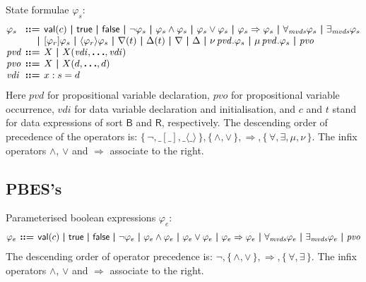 \documentclass[a4paper,fleqn,10pt]{article}
\makeatletter
\newcommand{\f}[1]{\ensuremath{\mathit{#1}}}
\newcommand{\sbool}{\ensuremath{\mathsf{B}}}
\newcommand{\sreal}{\ensuremath{\mathsf{R}}}
\newenvironment{tightarray}[1]
  {\setlength{\arraycolsep}{2pt}%
   \begin{array}{@{}#1@{}}%
  }
  {\end{array}%
  }
\newcommand{\set}[1]{\ensuremath{\{\,#1\,\}}}
\newcommand{\limp}{\ensuremath{\Rightarrow}}
\newcommand{\mb}[1]{\text{\boldmath$#1$}}
\makeatother
\begin{document}
State formulae $\varphi_s$:
\[\begin{tightarray}{lrl}
\varphi_s & \mb{::=} & \mathsf{val}(c)\ \mb{|}\ 
                     \mathsf{true}\ \mb{|}\ 
                     \mathsf{false}\ \mb{|}\ 
                     \neg \varphi_s\ \mb{|}\ 
                     \varphi_s \land \varphi_s\ \mb{|}\ 
                     \varphi_s \lor  \varphi_s\ \mb{|}\ 
                     \varphi_s \limp \varphi_s\ \mb{|}\ 
                     \forall_{\f{mvds}} \varphi_s\ \mb{|}\ 
                     \exists_{\f{mvds}} \varphi_s\\
        & \mb{|}   & [\varphi_r]\varphi_s\ \mb{|}\ 
                     \langle\varphi_r\rangle\varphi_s\ \mb{|}\ 
                     \nabla(t)\ \mb{|}\ 
                     \Delta(t)\ \mb{|}\ 
                     \nabla\ \mb{|}\ 
                     \Delta\ \mb{|}\ 
                     \nu\,\f{pvd}.\varphi_s\ \mb{|}\ 
                     \mu\,\f{pvd}.\varphi_s\ \mb{|}\ 
                     \f{pvo}\\
\f{pvd} & \mb{::=} & X\ \mb{|}\ X(\f{vdi},\mb{\ldots},\f{vdi})\\
\f{pvo} & \mb{::=} & X\ \mb{|}\ X(d,\mb{\ldots},d)\\
\f{vdi} & \mb{::=} & x: s = d\\
\end{tightarray}\]
Here 
$\f{pvd}$ for propositional variable declaration,
$\f{pvo}$ for propositional variable occurrence,
$\f{vdi}$ for data variable declaration and initialisation,
and $c$ and $t$ stand for data expressions of
sort $\sbool$ and $\sreal$, respectively.  The descending order of precedence
of the operators is: $\set{\neg, \_[\_], \_\langle\_\rangle},
\set{\land,\lor}, \limp, \set{\forall, \exists, \mu, \nu}$.  The infix
operators $\land$, $\lor$ and $\limp$ associate to the right.

\subsection{PBES's}

Parameterised boolean expressions $\varphi_e$:
\[\begin{tightarray}{lrl}
\varphi_e & \mb{::=} & \mathsf{val}(c)\ \mb{|}\ 
                       \mathsf{true}\ \mb{|}\ 
                       \mathsf{false}\ \mb{|}\ 
                       \neg \varphi_e\ \mb{|}\ 
                       \varphi_e \land \varphi_e\ \mb{|}\ 
                       \varphi_e \lor \varphi_e\ \mb{|}\ 
                       \varphi_e \limp \varphi_e\ \mb{|}\ 
                       \forall_{\f{mvds}} \varphi_e\ \mb{|}\ 
                       \exists_{\f{mvds}} \varphi_e\ \mb{|}\ 
                       \f{pvo}
\end{tightarray}\]
The descending order of operator precedence is: $\neg, \set{\land, \lor}, \limp, \set{\forall, \exists}$.  
The infix operators $\land$, $\lor$ and $\limp$ associate to the right.
\end{document}
